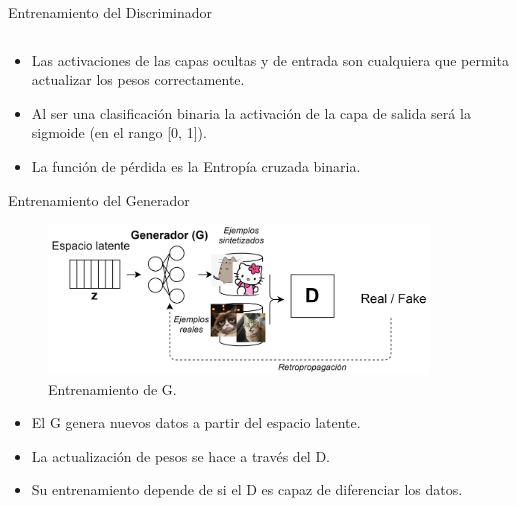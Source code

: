 \begin{frame}{Entrenamiento del Discriminador}
\begin{columns}[T]
\begin{column}{.45\textwidth}
    \end{column}
    \end{columns}
    
    \begin{itemize}
        \item Las activaciones de las capas ocultas y de entrada son \alert{cualquiera} que permita actualizar los pesos \alert{correctamente}.
        
        \item Al ser una clasificación \alert{binaria} la activación de la capa de salida será la sigmoide (en el rango [0, 1]).
        
        \item La función de \alert{pérdida} es la Entropía cruzada binaria.
    \end{itemize}
    
\end{frame}

\begin{frame}{Entrenamiento del Generador}
    
    \begin{figure}
        \centering
        \includegraphics[width=0.9\textwidth]{Slides/figures/GAN/Generador Iteracion.png}
        \caption{Entrenamiento de G.}
    \end{figure}
    
    \begin{itemize}
        \item El G genera \alert{nuevos} datos a partir del espacio latente.
        \item La \alert{actualización} de pesos se hace a través del \alert{D}.
        \item Su entrenamiento \alert{depende} de si el \alert{D} es capaz de diferenciar los datos.
    \end{itemize}
    
\end{frame}

